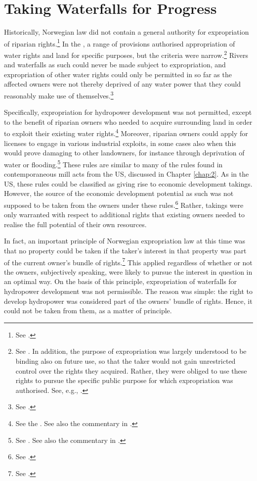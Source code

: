 \section{Taking Waterfalls for Progress}\label{sec:twp}

Historically, Norwegian law did not contain a general authority for expropriation of riparian rights.\footnote{See \cite[29]{amundsen28}.} In the \cite{wra88}, a range of provisions authorised appropriation of water rights and land for specific purposes, but the criteria were narrow.\footnote{See \cite[69-85]{dahl88}. In addition, the purpose of expropriation was largely understood to be binding also on future use, so that the taker would not gain unrestricted control over the rights they acquired. Rather, they were obliged to use these rights to pursue the specific public purpose for which expropriation was authorised. See, e.g., \cite[133-140]{rygh12}.} Rivers and waterfalls as such could never be made subject to expropriation, and expropriation of other water rights could only be permitted in so far as the affected owners were not thereby deprived of any water power that they could reasonably make use of themselves.\footnote{See \cite[58|60]{dahl88}.}

Specifically, expropriation for hydropower development was not permitted, except to the benefit of riparian owners who needed to acquire surrounding land in order to exploit their existing water rights.\footnote{See the \cite[15-16]{wra88}. See also the commentary in \cite[60-65]{dahl88}.} Moreover, riparian owners could apply for licenses to engage in various industrial exploits, in some cases also when this would prove damaging to other landowners, for instance through deprivation of water or flooding.\footnote{See \cite[14]{wra88}. See also the commentary in \cite[54-60]{dahl88}.} These rules are similar to many of the rules found in contemporaneous mill acts from the US, discussed in Chapter \ref{chap:2}. As in the US, these rules could be classified as giving rise to economic development takings. However, the source of the economic development potential as such was not supposed to be taken from the owners under these rules.\footnote{See \cite[168-170]{dahl88}.} Rather, takings were only warranted with respect to additional rights that existing owners needed to realise the full potential of their own resources.

In fact, an important principle of Norwegian expropriation law at this time was that no property could be taken if the taker's interest in that property was part of the current owner's bundle of rights.\footnote{See \cite[168-170]{dahl88}.} This applied regardless of whether or not the owners, subjectively speaking, were likely to pursue the interest in question in an optimal way. On the basis of this principle, expropriation of waterfalls for hydropower development was not permissible. The reason was simple: the right to develop hydropower was considered part of the owners' bundle of rights. 
Hence, it could not be taken from them, as a matter of principle. 


